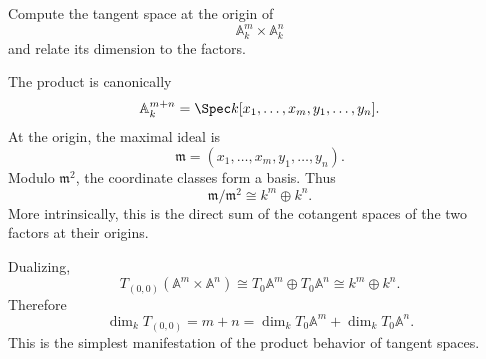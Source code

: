 \begin{problem}\label{prob:vi32-19}
Compute the tangent space at the origin of
\[
\mathbb A^m_k\times\mathbb A^n_k
\]
and relate its dimension to the factors.

\end{problem}

\ifdefined\FullProblemDossiers
\begin{solution}
The product is canonically
\[
\mathbb A^{m+n}_k
=
\Spec k[x_1,\ldots,x_m,y_1,\ldots,y_n].
\]
At the origin, the maximal ideal is
\[
\mathfrak m=(x_1,\ldots,x_m,y_1,\ldots,y_n).
\]
Modulo \(\mathfrak m^2\), the coordinate classes form a basis. Thus
\[
\mathfrak m/\mathfrak m^2
\cong
k^m\oplus k^n.
\]
More intrinsically, this is the direct sum of the cotangent spaces of the two factors at their origins.

Dualizing,
\[
T_{(0,0)}
(\mathbb A^m\times\mathbb A^n)
\cong
T_0\mathbb A^m\oplus T_0\mathbb A^n
\cong
k^m\oplus k^n.
\]
Therefore
\[
\boxed{
\dim_kT_{(0,0)}
=
m+n
=
\dim_kT_0\mathbb A^m+\dim_kT_0\mathbb A^n.
}
\]
This is the simplest manifestation of the product behavior of tangent spaces.
\end{solution}
\fi

